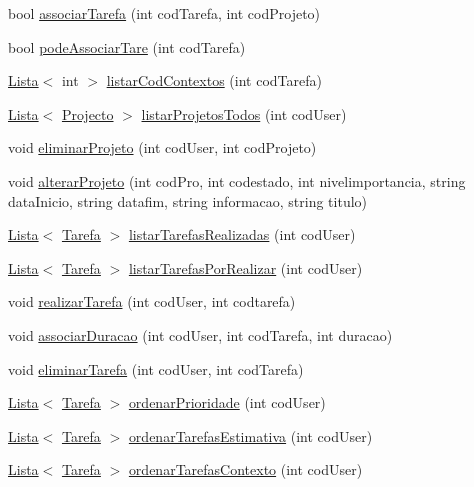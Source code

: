 \begin{DoxyCompactItemize}
\item 
bool \hyperlink{class_b_dados_a1128fd4d73586d83022b82e96415840f}{associar\-Tarefa} (int cod\-Tarefa, int cod\-Projeto)
\item 
bool \hyperlink{class_b_dados_a8c4d12d51845e32ec09b1df737c35b8a}{pode\-Associar\-Tare} (int cod\-Tarefa)
\item 
\hyperlink{class_lista}{Lista}$<$ int $>$ \hyperlink{class_b_dados_a30b07ef16886417fce5aee48e702ced5}{listar\-Cod\-Contextos} (int cod\-Tarefa)
\item 
\hyperlink{class_lista}{Lista}$<$ \hyperlink{class_projecto}{Projecto} $>$ \hyperlink{class_b_dados_ac68b96751def3a8ef11e8df3aafb21dc}{listar\-Projetos\-Todos} (int cod\-User)
\item 
void \hyperlink{class_b_dados_ad39cd045bce3925493aa756f28f5a947}{eliminar\-Projeto} (int cod\-User, int cod\-Projeto)
\item 
void \hyperlink{class_b_dados_abde421721062365126ab62d057e3d259}{alterar\-Projeto} (int cod\-Pro, int codestado, int nivelimportancia, string data\-Inicio, string datafim, string informacao, string titulo)
\item 
\hyperlink{class_lista}{Lista}$<$ \hyperlink{class_tarefa}{Tarefa} $>$ \hyperlink{class_b_dados_a6857fb5fe205fe9d5ec098c6ac9a45ca}{listar\-Tarefas\-Realizadas} (int cod\-User)
\item 
\hyperlink{class_lista}{Lista}$<$ \hyperlink{class_tarefa}{Tarefa} $>$ \hyperlink{class_b_dados_a2010e43758723749b02084010512974e}{listar\-Tarefas\-Por\-Realizar} (int cod\-User)
\item 
void \hyperlink{class_b_dados_aafb7b3d72a99928eec7ac1e54ba6e8f3}{realizar\-Tarefa} (int cod\-User, int codtarefa)
\item 
void \hyperlink{class_b_dados_a10278a2424c4814eff2ee546aac76e82}{associar\-Duracao} (int cod\-User, int cod\-Tarefa, int duracao)
\item 
void \hyperlink{class_b_dados_a327c6e4b41f2612ff7451b32b405a37b}{eliminar\-Tarefa} (int cod\-User, int cod\-Tarefa)
\item 
\hyperlink{class_lista}{Lista}$<$ \hyperlink{class_tarefa}{Tarefa} $>$ \hyperlink{class_b_dados_a94d9f0dcf3d888f90c54ae5821a8a9b1}{ordenar\-Prioridade} (int cod\-User)
\item 
\hyperlink{class_lista}{Lista}$<$ \hyperlink{class_tarefa}{Tarefa} $>$ \hyperlink{class_b_dados_ac8b924f399b297f3ec742c9b71d0c546}{ordenar\-Tarefas\-Estimativa} (int cod\-User)
\item 
\hyperlink{class_lista}{Lista}$<$ \hyperlink{class_tarefa}{Tarefa} $>$ \hyperlink{class_b_dados_a107c634dd2407846c3425f1b89da5d02}{ordenar\-Tarefas\-Contexto} (int cod\-User)

\end{DoxyCompactItemize}
